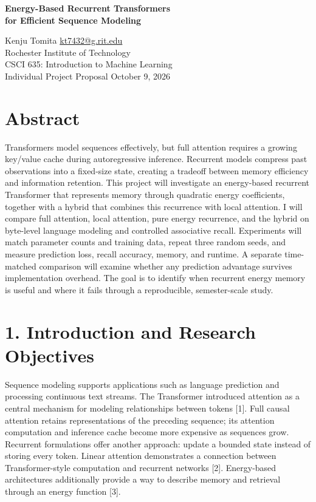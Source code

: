 \documentclass[11pt,letterpaper]{article}
\begin{document}
\begin{center}
{\Large\bfseries Energy-Based Recurrent Transformers\\for Efficient Sequence Modeling}\par
\vspace{3pt}
Kenju Tomita \quad \href{mailto:kt7432@g.rit.edu}{kt7432@g.rit.edu}\\
Rochester Institute of Technology\\
CSCI 635: Introduction to Machine Learning\\
Individual Project Proposal \quad October 9, 2026
\end{center}

\section*{Abstract}

Transformers model sequences effectively, but full attention requires a growing key/value cache during autoregressive inference. Recurrent models compress past observations into a fixed-size state, creating a tradeoff between memory efficiency and information retention. This project will investigate an energy-based recurrent Transformer that represents memory through quadratic energy coefficients, together with a hybrid that combines this recurrence with local attention. I will compare full attention, local attention, pure energy recurrence, and the hybrid on byte-level language modeling and controlled associative recall. Experiments will match parameter counts and training data, repeat three random seeds, and measure prediction loss, recall accuracy, memory, and runtime. A separate time-matched comparison will examine whether any prediction advantage survives implementation overhead. The goal is to identify when recurrent energy memory is useful and where it fails through a reproducible, semester-scale study.

\section*{1. Introduction and Research Objectives}

Sequence modeling supports applications such as language prediction and processing continuous text streams. The Transformer introduced attention as a central mechanism for modeling relationships between tokens [1]. Full causal attention retains representations of the preceding sequence; its attention computation and inference cache become more expensive as sequences grow. Recurrent formulations offer another approach: update a bounded state instead of storing every token. Linear attention demonstrates a connection between Transformer-style computation and recurrent networks [2]. Energy-based architectures additionally provide a way to describe memory and retrieval through an energy function [3].
\end{document}
